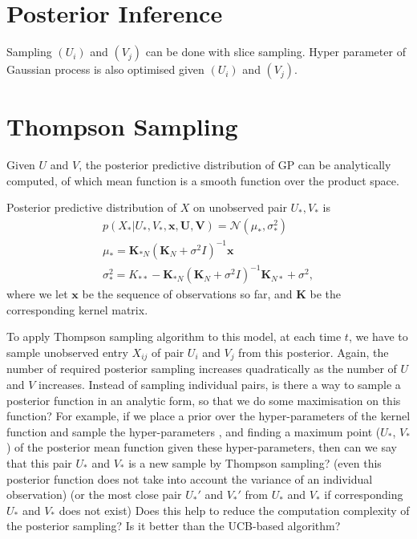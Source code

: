 \documentclass{article} %
\theoremstyle{definition}
\begin{document}
\section{Posterior Inference}
Sampling $(U_i)$ and $(V_j)$ can be done with slice sampling. Hyper parameter of Gaussian process is also optimised given $(U_i)$ and $(V_j)$.

\section{Thompson Sampling}
Given $U$ and $V$, the posterior predictive distribution of GP can be analytically computed, of which mean function is a smooth function over the product space.

Posterior predictive distribution of $X$ on unobserved pair $U_*, V_*$ is
\begin{align}
p(X_* | {U}_*, {V}_*, \mathbf{x}, \mathbf{U}, \mathbf{V}) = \mathcal{N}(\mu_*, \sigma_*^2)\\
\mu_* = \mathbf{K}_{*N}(\mathbf{K}_N + \sigma^2 I)^{-1} \mathbf{x} \label{eqn:pmean}\\
\sigma_*^2 = K_{**} - \mathbf{K}_{*N}(\mathbf{K}_N + \sigma^2 I)^{-1} \mathbf{K}_{N*} + \sigma^2,
\end{align}
where we let $\mathbf{x}$ be the sequence of observations so far, and $\mathbf{K}$ be the corresponding kernel matrix.

To apply Thompson sampling algorithm to this model, at each time $t$, we have to sample unobserved entry $X_{ij}$ of pair $U_i$ and $V_j$ from this posterior. Again, the number of required posterior sampling increases quadratically as the number of $U$ and $V$ increases. Instead of sampling  individual pairs, is there a way to sample a posterior function in an analytic form, so that we do some maximisation on this function? For example, if we place a prior over the hyper-parameters of the kernel function and sample the hyper-parameters \cite{neal1997monte}, and finding a maximum point ($U_*$, $V_*$) of the posterior mean function given these hyper-parameters, then can we say that this pair $U_*$ and $V_*$ is a new sample by Thompson sampling? (even this posterior function does not take into account the variance of an individual observation) (or the most close pair $U_*'$ and $V_*'$ from $U_*$ and $V_*$ if corresponding $U_*$ and $V_*$ does not exist) Does this help to reduce the computation complexity of the posterior sampling? Is it better than the UCB-based algorithm? \cite{krause2011contextual}



\end{document}
